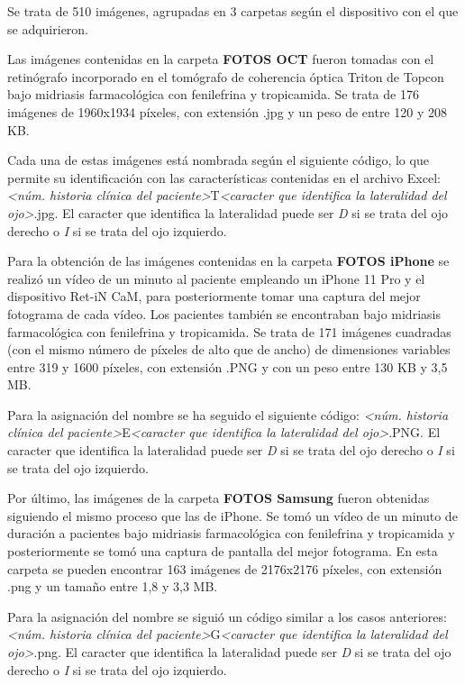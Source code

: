 Se trata de 510 imágenes, agrupadas en 3 carpetas según el dispositivo con el que se adquirieron.

Las imágenes contenidas en la carpeta \textbf{FOTOS OCT} fueron tomadas con el retinógrafo incorporado en el tomógrafo de coherencia óptica Triton de Topcon bajo midriasis farmacológica con fenilefrina y tropicamida. Se trata de 176 imágenes de 1960x1934 píxeles, con extensión .jpg y un peso de entre 120 y 208 KB. 

Cada una de estas imágenes está nombrada según el siguiente código, lo que permite su identificación con las características contenidas en el archivo Excel: \textit{<núm. historia clínica del paciente>}T\textit{<caracter que identifica la lateralidad del ojo>}.jpg. El caracter que identifica la lateralidad puede ser \textit{D} si se trata del ojo derecho o \textit{I} si se trata del ojo izquierdo.

Para la obtención de las imágenes contenidas en la carpeta \textbf{FOTOS iPhone} se realizó un vídeo de un minuto al paciente empleando un iPhone 11 Pro y el dispositivo Ret-iN CaM, para posteriormente tomar una captura del mejor fotograma de cada vídeo. Los pacientes también se encontraban bajo midriasis farmacológica con fenilefrina y tropicamida. Se trata de 171 imágenes cuadradas (con el mismo número de píxeles de alto que de ancho) de dimensiones variables entre 319 y 1600 píxeles, con extensión .PNG y con un peso entre 130 KB y 3,5 MB.

Para la asignación del nombre se ha seguido el siguiente código: \textit{<núm. historia clínica del paciente>}E\textit{<caracter que identifica la lateralidad del ojo>}.PNG. El caracter que identifica la lateralidad puede ser \textit{D} si se trata del ojo derecho o \textit{I} si se trata del ojo izquierdo.

Por último, las imágenes de la carpeta \textbf{FOTOS Samsung} fueron obtenidas siguiendo el mismo proceso que las de iPhone. Se tomó un vídeo de un minuto de duración a pacientes bajo midriasis farmacológica con fenilefrina y tropicamida y posteriormente se tomó una captura de pantalla del mejor fotograma. En esta carpeta se pueden encontrar 163 imágenes de 2176x2176 píxeles, con extensión .png y un tamaño entre 1,8 y 3,3 MB.

Para la asignación del nombre se siguió un código similar a los casos anteriores: \textit{<núm. historia clínica del paciente>}G\textit{<caracter que identifica la lateralidad del ojo>}.png. El caracter que identifica la lateralidad puede ser \textit{D} si se trata del ojo derecho o \textit{I} si se trata del ojo izquierdo.

